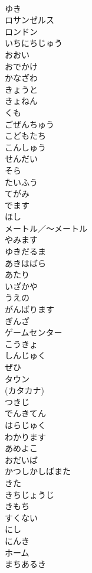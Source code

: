 \documentclass[8pt]{extreport}
\begin{document}
\begin{CJK}{UTF8}{min}
\\	ゆき	
\\	ロサンゼルス	
\\	ロンドン	
\\	いちにちじゅう	
\\	おおい	
\\	おでかけ	
\\	かなざわ	
\\	きょうと	
\\	きょねん	
\\	くも	
\\	ごぜんちゅう	
\\	こどもたち	
\\	こんしゅう	
\\	せんだい	
\\	そら	
\\	たいふう	
\\	てがみ	
\\	でます	
\\	ほし	
\\	メートル／～メートル	
\\	やみます	
\\	ゆきだるま	
\\	あきはばら	
\\	あたり	
\\	いざかや	
\\	うえの	
\\	がんばります	
\\	ぎんざ	
\\	ゲームセンター	
\\	こうきょ	
\\	しんじゅく	
\\	ぜひ	
\\	タウン	
\\	(カタカナ)
\\	つきじ	
\\	でんきてん	
\\	はらじゅく	
\\	わかります	
\\	あめよこ	
\\	おだいば	
\\	かつしかしばまた	
\\	きた	
\\	きちじょうじ	
\\	きもち	
\\	すくない	
\\	にし	
\\	にんき	
\\	ホーム	
\\	まちあるき	

\end{CJK}
\end{document}
